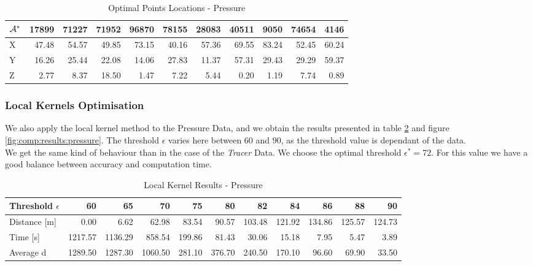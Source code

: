 \begin{table}[h]
\centering
\footnotesize
\begin{tabular}{l|rrrrrrrrrr}
\toprule
$\mathcal{A}^*$ &  17899 &  71227 &  71952 &  96870 &  78155 &  28083 &  40511 &  9050  &  74654 &  4146  \\
\midrule
X &  47.48 &  54.57 &  49.85 &  73.15 &  40.16 &  57.36 &  69.55 &  83.24 &  52.45 &  60.24 \\
Y &  16.26 &  25.44 &  22.08 &  14.06 &  27.83 &  11.37 &  57.31 &  29.43 &  29.29 &  59.37 \\
Z &   2.77 &   8.37 &  18.50 &   1.47 &   7.22 &   5.44 &   0.20 &   1.19 &   7.74 &   0.89 \\
\bottomrule
\end{tabular}
\caption{Optimal Points Locations - Pressure}
\label{tab:opt_small:pressure}
\end{table}

\subsubsection{Local Kernels Optimisation}

We also apply the local kernel method to the Pressure Data, and we obtain the results presented in table \ref{tab:comp:results:pressure} and figure \ref{fig:comp:results:pressure}. The threshold $\epsilon$ varies here between $60$ and $90$, as the threshold value is dependant of the data. \\

We get the same kind of behaviour than in the case of the \textit{Tracer} Data. We choose the optimal threshold $\epsilon^* = 72$. For this value we have a good balance between accuracy and computation time. 



\begin{table}[h]
\centering
\scriptsize
\begin{tabular}{l|rrrrrrrrrr}
\toprule
Threshold $\epsilon$ &     60  &     65  &     70  &    75  &    80  &    82  &    84  &    86  &    88  &    90     \\
\midrule
Distance [m]       &    0.00 &    6.62 &   62.98 &  83.54 &  90.57 & 103.48 & 121.92 & 134.86 & 125.57 & 124.73   \\
Time [s]        & 1217.57 & 1136.29 &  858.54 & 199.86 &  81.43 &  30.06 &  15.18 &   7.95 &   5.47 &   3.89   \\
Average d & 1289.50 & 1287.30 & 1060.50 & 281.10 & 376.70 & 240.50 & 170.10 &  96.60 &  69.90 &  33.50   \\
\bottomrule
\end{tabular}
\caption{Local Kernel Results - Pressure}
\label{tab:comp:results:pressure}
\end{table}

